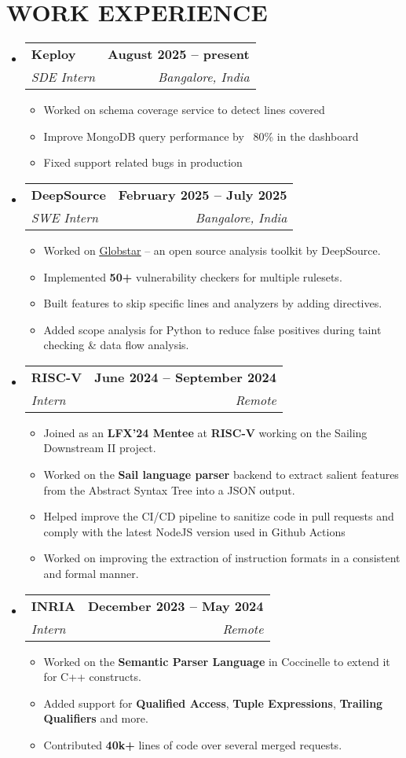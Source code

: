 \documentclass[letterpaper,11pt]{article}
\makeatletter
\newcommand{\resumeItem}[1]{
  \item\small{
    {#1 \vspace{-2pt}}
  }
}
\newcommand{\resumeSubheading}[4]{
  \vspace{-2pt}\item
    \begin{tabular*}{1.0\textwidth}[t]{l@{\extracolsep{\fill}}r}
      \textbf{#1} & \textbf{\small #2} \\
      \textit{\small#3} & \textit{\small #4} \\
    \end{tabular*}\vspace{-7pt}
}
\newcommand{\resumeSubHeadingListStart}{\begin{itemize}[leftmargin=0.0in, label={}]}
\newcommand{\resumeSubHeadingListEnd}{\end{itemize}}
\newcommand{\resumeItemListStart}{\begin{itemize}}
\newcommand{\resumeItemListEnd}{\end{itemize}\vspace{-5pt}}
\makeatother
\begin{document}
\section{WORK EXPERIENCE}
  \resumeSubHeadingListStart
    \resumeSubheading{Keploy}{August 2025 -- present}{SDE Intern}{Bangalore, India}
    \resumeItemListStart
        \resumeItem{Worked on schema coverage service to detect lines covered}
        \resumeItem{Improve MongoDB query performance by ~80\% in the dashboard}
        \resumeItem{Fixed support related bugs in production}
    \resumeItemListEnd
    \resumeSubheading{DeepSource}{February 2025 -- July 2025}{SWE Intern}{Bangalore, India}
    \resumeItemListStart
        \resumeItem{Worked on \href{https://globstar.dev}{\underline{Globstar}} -- an open source analysis toolkit by DeepSource.}
        \resumeItem{Implemented \textbf{50+} vulnerability checkers for multiple rulesets.}
        \resumeItem{Built features to skip specific lines and analyzers by adding directives.}
        \resumeItem{Added scope analysis for Python to reduce false positives during taint checking \& data flow analysis.}
    \resumeItemListEnd
    \resumeSubheading{RISC-V}{June 2024 -- September 2024}{Intern}{Remote}
    \resumeItemListStart
        \resumeItem{Joined as an \textbf{LFX'24 Mentee} at \textbf{RISC-V} working on the Sailing Downstream II project.}
        \resumeItem{Worked on the \textbf{Sail language parser} backend to extract salient features from the Abstract Syntax Tree into a JSON output.}
        \resumeItem{Helped improve the CI/CD pipeline to sanitize code in pull requests and comply with the latest NodeJS version used in Github Actions}
        \resumeItem{Worked on improving the extraction of instruction formats in a consistent and formal manner.}
    \resumeItemListEnd
    \resumeSubheading
      {INRIA}{December 2023 -- May 2024}
      {Intern}{Remote}
      \resumeItemListStart
        \resumeItem{Worked on the \textbf{Semantic Parser Language} in Coccinelle to extend it for C++ constructs.}
        \resumeItem{Added support for \textbf{Qualified Access}, \textbf{Tuple Expressions}, \textbf{Trailing Qualifiers} and more.}
        \resumeItem{Contributed \textbf{40k+} lines of code over several merged requests.}
      \resumeItemListEnd    
  \resumeSubHeadingListEnd
\vspace{-8pt}
\end{document}
